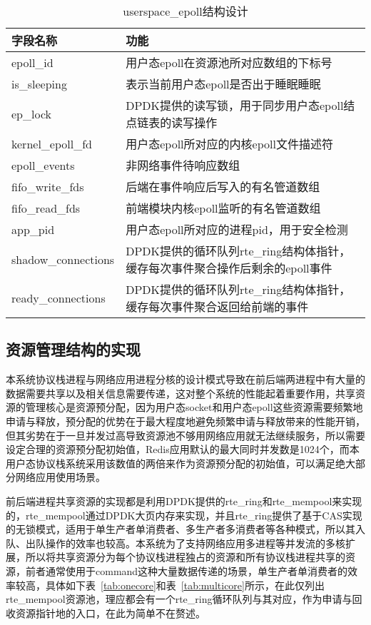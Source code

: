 \begin{table}[]
\centering
\caption{userspace\_epoll结构设计}
\label{tab:epoll}
\begin{tabular}{lp{10cm}}
\toprule[1.5pt]
\textbf{字段名称} & \textbf{功能} \\ 
\midrule[1pt]
epoll\_id & 用户态epoll在资源池所对应数组的下标号 \\
is\_sleeping & 表示当前用户态epoll是否出于睡眠睡眠 \\
ep\_lock & DPDK提供的读写锁，用于同步用户态epoll结点链表的读写操作 \\
kernel\_epoll\_fd & 用户态epoll所对应的内核epoll文件描述符 \\
epoll\_events & 非网络事件待响应数组 \\
fifo\_write\_fds & 后端在事件响应后写入的有名管道数组 \\
fifo\_read\_fds & 前端模块内核epoll监听的有名管道数组 \\
app\_pid & 用户态epoll所对应的进程pid，用于安全检测 \\
shadow\_connections & DPDK提供的循环队列rte\_ring结构体指针，缓存每次事件聚合操作后剩余的epoll事件 \\
ready\_connections & DPDK提供的循环队列rte\_ring结构体指针，缓存每次事件聚合返回给前端的事件 \\
\bottomrule[1.5pt]
\end{tabular}
\end{table}

\subsection{资源管理结构的实现}

本系统协议栈进程与网络应用进程分核的设计模式导致在前后端两进程中有大量的数据需要共享以及相关信息需要传递，这对整个系统的性能起着重要作用，共享资源的管理核心是资源预分配，因为用户态socket和用户态epoll这些资源需要频繁地申请与释放，预分配的优势在于最大程度地避免频繁申请与释放带来的性能开销，但其劣势在于一旦并发过高导致资源池不够用网络应用就无法继续服务，所以需要设定合理的资源预分配初始值，Redis应用默认的最大同时并发数是1024个，而本用户态协议栈系统采用该数值的两倍来作为资源预分配的初始值，可以满足绝大部分网络应用使用场景。

前后端进程共享资源的实现都是利用DPDK提供的rte\_ring和rte\_mempool来实现的，rte\_mempool通过DPDK大页内存来实现，并且rte\_ring提供了基于CAS实现的无锁模式，适用于单生产者单消费者、多生产者多消费者等各种模式，所以其入队、出队操作的效率也较高。本系统为了支持网络应用多进程等并发流的多核扩展，所以将共享资源分为每个协议栈进程独占的资源和所有协议栈进程共享的资源，前者通常使用于command这种大量数据传递的场景，单生产者单消费者的效率较高，具体如下表~\ref{tab:onecore}和表~\ref{tab:multicore}所示，在此仅列出rte\_mempool资源池，理应都会有一个rte\_ring循环队列与其对应，作为申请与回收资源指针地的入口，在此为简单不在赘述。

